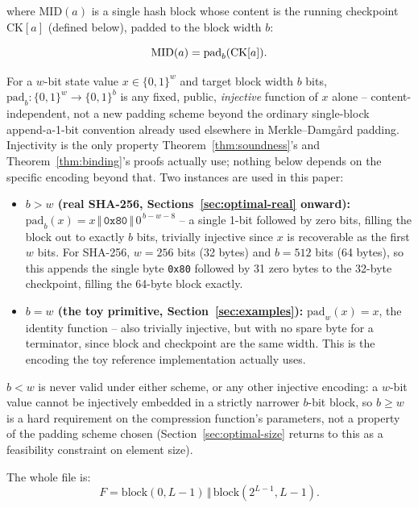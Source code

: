 where $\mathrm{MID}(a)$ is a single hash block whose content is the running
checkpoint $\mathrm{CK}[a]$ (defined below), padded to the block width $b$:

\begin{equation}
\mathrm{MID}(a) = \mathrm{pad}_b(\mathrm{CK}[a]).
\end{equation}

\begin{definition}
\label{def:padb}
For a $w$-bit state value $x \in \{0,1\}^w$ and target block width $b$
bits, $\mathrm{pad}_b: \{0,1\}^w \to \{0,1\}^b$ is any fixed, public,
\emph{injective} function of $x$ alone -- content-independent, not a new
padding scheme beyond the ordinary single-block append-a-1-bit convention
already used elsewhere in Merkle--Damg\aa rd padding. Injectivity is the
only property Theorem~\ref{thm:soundness}'s and Theorem~\ref{thm:binding}'s
proofs actually use; nothing below depends on the specific encoding beyond
that. Two instances are used in this paper:
\begin{itemize}
\item \textbf{$b > w$ (real SHA-256, Sections~\ref{sec:optimal-real}
  onward):} $\mathrm{pad}_b(x) = x \,\Vert\, \texttt{0x80} \,\Vert\,
  0^{\,b-w-8}$ -- a single 1-bit followed by zero bits, filling the block
  out to exactly $b$ bits, trivially injective since $x$ is recoverable as
  the first $w$ bits. For SHA-256, $w=256$ bits (32 bytes) and $b=512$ bits
  (64 bytes), so this appends the single byte \texttt{0x80} followed by 31
  zero bytes to the 32-byte checkpoint, filling the 64-byte block exactly.
\item \textbf{$b = w$ (the toy primitive, Section~\ref{sec:examples}):}
  $\mathrm{pad}_w(x) = x$, the identity function -- also trivially
  injective, but with no spare byte for a terminator, since block and
  checkpoint are the same width. This is the encoding the toy reference
  implementation actually uses.
\end{itemize}
$b < w$ is never valid under either scheme, or any other injective
encoding: a $w$-bit value cannot be injectively embedded in a strictly
narrower $b$-bit block, so $b \ge w$ is a hard requirement on the
compression function's parameters, not a property of the padding scheme
chosen (Section~\ref{sec:optimal-size} returns to this as a feasibility
constraint on element size).
\end{definition}

The whole file is:
\begin{equation}
F = \mathrm{block}(0, L-1) \,\Vert\, \mathrm{block}(2^{L-1}, L-1).
\end{equation}

